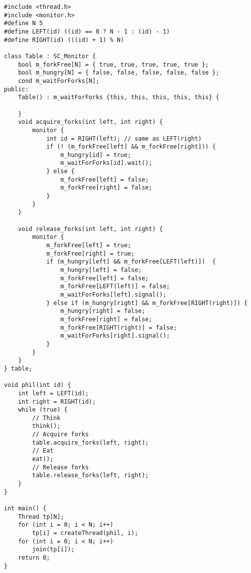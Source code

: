 \begin{lstlisting}
#include <thread.h>
#include <monitor.h>
#define N 5
#define LEFT(id) ((id) == 0 ? N - 1 : (id) - 1)
#define RIGHT(id) (((id) + 1) % N)

class Table : SC_Monitor {
    bool m_forkFree[N] = { true, true, true, true, true };
    bool m_hungry[N] = { false, false, false, false, false };
    cond m_waitForForks[N];
public:
    Table() : m_waitForForks {this, this, this, this, this} {
        
    }
    void acquire_forks(int left, int right) {
        monitor {
            int id = RIGHT(left); // same as LEFT(right)
            if (! (m_forkFree[left] && m_forkFree[right])) {
                m_hungry[id] = true;
                m_waitForForks[id].wait();
            } else {
                m_forkFree[left] = false;
                m_forkFree[right] = false;
            }
        }
    }

    void release_forks(int left, int right) {
        monitor {
            m_forkFree[left] = true;
            m_forkFree[right] = true;
            if (m_hungry[left] && m_forkFree[LEFT(left)])  {
                m_hungry[left] = false;
                m_forkFree[left] = false;
                m_forkFree[LEFT(left)] = false;
                m_waitForForks[left].signal();
            } else if (m_hungry[right] && m_forkFree[RIGHT(right)]) {
                m_hungry[right] = false;
                m_forkFree[right] = false;
                m_forkFree[RIGHT(right)] = false;
                m_waitForForks[right].signal();
            }
        }
    }
} table;

void phil(int id) {
    int left = LEFT(id);
    int right = RIGHT(id);
    while (true) {
        // Think
        think();
        // Acquire forks
        table.acquire_forks(left, right);
        // Eat
        eat();
        // Release forks
        table.release_forks(left, right);
    }
}

int main() {
    Thread tp[N];
    for (int i = 0; i < N; i++) 
        tp[i] = createThread(phil, i);
    for (int i = 0; i < N; i++) 
        join(tp[i]);
    return 0;
}

\end{lstlisting}
